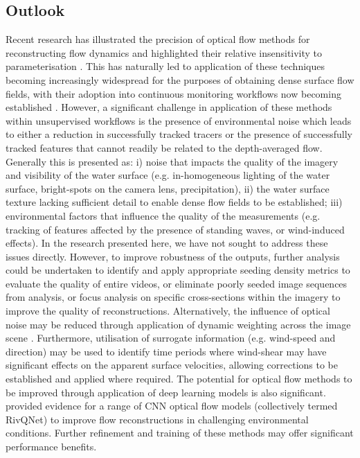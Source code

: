 \documentclass[hess, manuscript]{copernicus} %
\begin{document}
\subsection{Outlook}
Recent research has illustrated the precision of optical flow methods for reconstructing flow dynamics and highlighted their relative insensitivity to parameterisation \citep{Pearce2020}. This has naturally led to application of these techniques becoming increasingly widespread for the purposes of obtaining dense surface flow fields, with their adoption into continuous monitoring workflows now becoming established \citep[e.g.][]{Hutley2023}. However, a significant challenge in application of these methods within unsupervised workflows is the presence of environmental noise which leads to either a reduction in successfully tracked tracers or the presence of successfully tracked features that cannot readily be related to the depth-averaged flow. Generally this is presented as: i) noise that impacts the quality of the imagery and visibility of the water surface (e.g. in-homogeneous lighting of the water surface, bright-spots on the camera lens, precipitation), ii) the water surface texture lacking sufficient detail to enable dense flow fields to be established; iii) environmental factors that influence the quality of the measurements (e.g. tracking of features affected by the presence of standing waves, or wind-induced effects). In the research presented here, we have not sought to address these issues directly. However, to improve robustness of the outputs, further analysis could be undertaken to identify and apply appropriate seeding density metrics to evaluate the quality of entire videos, or eliminate poorly seeded image sequences from analysis, or focus analysis on specific cross-sections within the imagery to improve the quality of reconstructions. Alternatively, the influence of optical noise may be reduced through application of dynamic weighting across the image scene \citep[e.g.][]{Cao2022}. Furthermore, utilisation of surrogate information (e.g. wind-speed and direction) may be used to identify time periods where wind-shear may have significant effects on the apparent surface velocities, allowing corrections to be established and applied where required. The potential for optical flow methods to be improved through application of deep learning models is also significant. \citet{Ansari2023} provided evidence for a range of CNN optical flow models (collectively termed RivQNet) to improve flow reconstructions in challenging environmental conditions. Further refinement and training of these methods may offer significant performance benefits. 
\end{document}
